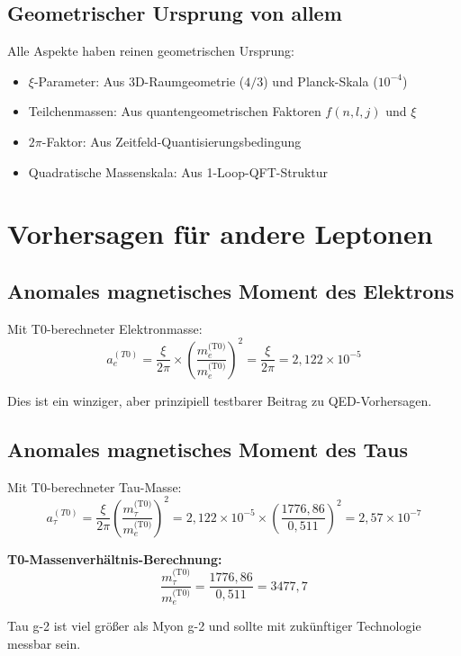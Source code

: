 \documentclass[12pt,a4paper]{article}
\numberwithin{equation}{section}
\begin{document}
	\subsection{Geometrischer Ursprung von allem}
	
	Alle Aspekte haben reinen geometrischen Ursprung:
	\begin{itemize}
		\item $\xi$-Parameter: Aus 3D-Raumgeometrie ($4/3$) und Planck-Skala ($10^{-4}$)
		\item Teilchenmassen: Aus quantengeometrischen Faktoren $f(n,l,j)$ und $\xi$
		\item $2\pi$-Faktor: Aus Zeitfeld-Quantisierungsbedingung
		\item Quadratische Massenskala: Aus 1-Loop-QFT-Struktur
	\end{itemize}
	
	\section{Vorhersagen f\"ur andere Leptonen}
	
	\subsection{Anomales magnetisches Moment des Elektrons}
	
	Mit T0-berechneter Elektronmasse:
	\begin{equation}
		a_e^{(T0)} = \frac{\xi}{2\pi} \times \left(\frac{m_e^{\text{(T0)}}}{m_e^{\text{(T0)}}}\right)^2 = \frac{\xi}{2\pi} = 2{,}122 \times 10^{-5}
	\end{equation}
	
	Dies ist ein winziger, aber prinzipiell testbarer Beitrag zu QED-Vorhersagen.
	
	\subsection{Anomales magnetisches Moment des Taus}
	
	Mit T0-berechneter Tau-Masse:
	\begin{equation}
		a_\tau^{(T0)} = \frac{\xi}{2\pi} \left(\frac{m_\tau^{\text{(T0)}}}{m_e^{\text{(T0)}}}\right)^2 = 2{,}122 \times 10^{-5} \times \left(\frac{1776{,}86}{0{,}511}\right)^2 = 2{,}57 \times 10^{-7}
	\end{equation}
	
	\begin{t0berechnung}
		\textbf{T0-Massenverh\"altnis-Berechnung:}
		\begin{equation}
			\frac{m_\tau^{\text{(T0)}}}{m_e^{\text{(T0)}}} = \frac{1776{,}86}{0{,}511} = 3477{,}7
		\end{equation}
		
		Tau g-2 ist viel gr\"o\ss{}er als Myon g-2 und sollte mit zuk\"unftiger Technologie messbar sein.
	\end{t0berechnung}
	
\end{document}
